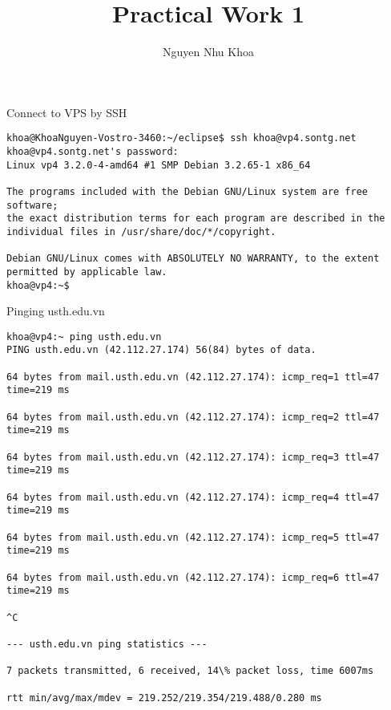 \documentclass{report}
\title{Practical Work 1}
\author{Nguyen Nhu Khoa}
\begin{document}
\maketitle
\begin{section}{Connect to VPS by SSH}
\begin{verbatim}
khoa@KhoaNguyen-Vostro-3460:~/eclipse$ ssh khoa@vp4.sontg.net
khoa@vp4.sontg.net's password: 
Linux vp4 3.2.0-4-amd64 #1 SMP Debian 3.2.65-1 x86_64

The programs included with the Debian GNU/Linux system are free software;
the exact distribution terms for each program are described in the
individual files in /usr/share/doc/*/copyright.

Debian GNU/Linux comes with ABSOLUTELY NO WARRANTY, to the extent
permitted by applicable law.
khoa@vp4:~$
\end{verbatim}
\end{section}

\begin{section}{Pinging usth.edu.vn}
\begin{verbatim}
khoa@vp4:~ ping usth.edu.vn
PING usth.edu.vn (42.112.27.174) 56(84) bytes of data.

64 bytes from mail.usth.edu.vn (42.112.27.174): icmp_req=1 ttl=47 time=219 ms

64 bytes from mail.usth.edu.vn (42.112.27.174): icmp_req=2 ttl=47 time=219 ms

64 bytes from mail.usth.edu.vn (42.112.27.174): icmp_req=3 ttl=47 time=219 ms

64 bytes from mail.usth.edu.vn (42.112.27.174): icmp_req=4 ttl=47 time=219 ms

64 bytes from mail.usth.edu.vn (42.112.27.174): icmp_req=5 ttl=47 time=219 ms

64 bytes from mail.usth.edu.vn (42.112.27.174): icmp_req=6 ttl=47 time=219 ms

^C

--- usth.edu.vn ping statistics ---

7 packets transmitted, 6 received, 14\% packet loss, time 6007ms

rtt min/avg/max/mdev = 219.252/219.354/219.488/0.280 ms
\end{verbatim}
\end{section}
\end{document}
